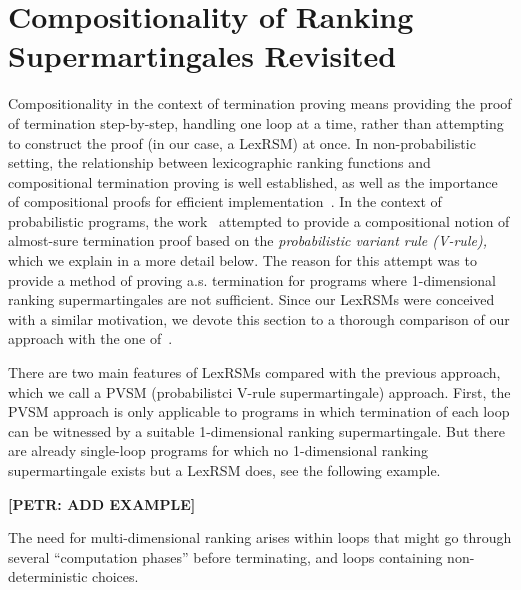 \section{Compositionality of Ranking Supermartingales Revisited}
\label{sec:compositional}

Compositionality in the context of termination proving means providing the 
proof of termination step-by-step, handling one loop at a time, rather than 
attempting to construct the proof (in our case, a LexRSM) at once. In non-probabilistic setting, the 
relationship between lexicographic ranking functions and compositional 
termination proving is well established, as well as the importance of 
compositional proofs for efficient implementation~\cite{xxx}. In the context of 
probabilistic programs, the work~\cite{HolgerPOPL} attempted to provide a 
compositional notion of almost-sure termination proof based on the 
\emph{probabilistic variant rule (V-rule),} which we explain in a more detail 
below. The reason for this attempt was to provide a method of proving a.s. termination for programs where 1-dimensional ranking supermartingales are not sufficient. Since our LexRSMs were conceived with a similar motivation, we devote this section to a thorough comparison of our approach with the one of~\cite{HolgerPOPL}. 

There are two main features of LexRSMs compared with the previous approach, which we call a PVSM (probabilistci V-rule supermartingale) approach. First, the PVSM approach is only applicable to programs in which termination of each loop can be witnessed by a suitable 1-dimensional ranking supermartingale. But there are already single-loop programs for which no 1-dimensional ranking supermartingale exists but a LexRSM does, see the following example.

\textbf{[PETR: ADD EXAMPLE]}

The need for multi-dimensional ranking arises within loops that might go through several ``computation phases'' before terminating, and loops containing non-deterministic choices.

